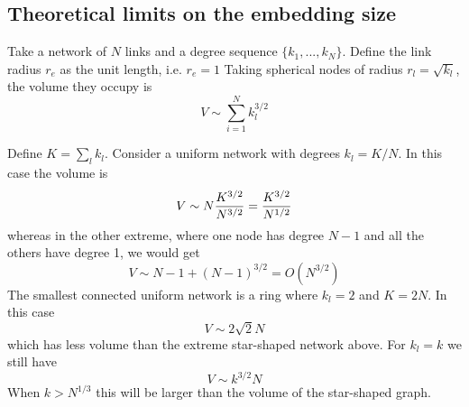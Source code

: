 \documentclass[nofootinbib,preprint,floatfix,titlepage,endfloats,superscriptaddress]{revtex4} %
\newcommand{\outNim}[1]{}
\begin{document}
\outNim{
Experimenting with the size of nodes revealed that instead of taking the area to be proportional to the degree, doing so with the node volume yields better results. This may be because of the following. 

Suppose we have $k$ links of cross-section $a_e$. 
Assume that they are uniformly spread at different solid angles around a center that is the center of the circular cap at one end of them. 
The question is: what is the minimum radius of sphere around the same center which would cross the links in such a way that the cross-section of one link on the sphere's surface would not intersect other links' cross-section. 
Take the circular cross-section of one link with the sphere. Connecting the center of the sphere to this circle yields a cone, whose volume is $h a_e /3$, with $h=\sqrt{r^2- r_e^2}$ being the height of the cone. If the number of links is large and we work with the smallest radius at which links don't intersect, the total volume of these cones will be close to the volume of the sphere, $4\pi r^3/3$. Solving for $r$ yields
\[ {k\pi\over 3} r_e^2 h \approx {k\pi\over 3} r_e^2 r =  {4\pi\over 3} r^3 \quad \Rightarrow \quad r = {\sqrt{k} \over 2} r_e  \]
When $k \gg 1$ The links may cover the surface of the sphere and so $k \pi r_e^2 \approx 4 \pi r^2$, which also yields $r = \sqrt{k}r_e /2$.  
However, when $k$ is small, the volume of the cones is much smaller than the volume of the sphere. In fact for $k=1,2$ the volume of the cones is zero and their cross-section with the sphere becomes one of the great circles of the sphere. This means that 
\[ \pi r_e^2 = \pi r^2  \quad \Rightarrow \quad  r = r_e.\]
} %

\subsection{Theoretical limits on the embedding size}
Take a network of $N$ links and a degree sequence $\{k_1,...,k_N\}$. Define the link radius $r_e$ as the unit length, i.e. $r_e = 1$ Taking spherical nodes of radius $r_l = \sqrt{k_l}$, the volume they occupy is 
\[V \sim \sum_{i=1}^N k_l^{3/2}\]


Define $K= \sum_l k_l$. 
Consider 
a uniform network with degrees $k_l = K/N$. In this case the volume is 
\begin{equation}
    V \sim N {K^{3/2}\over N^{3/2}} = {K^{3/2}\over N^{1/2}} \label{eq:uniform}
\end{equation}
whereas in the other extreme, where one node has degree $N-1$ and all the others have degree 1, we would get
\[V \sim N-1+ (N-1)^{3/2} = O( N^{3/2})\]
The smallest connected uniform network is a ring where $k_l=2$ and $K = 2N$. In this case
\[V\sim 2\sqrt{2} N \]
which has less volume than the extreme star-shaped network above. For $k_l = k $ we still have 
\[V \sim k^{3/2} N \]
When $k > N^{1/3}$ this will be larger than the volume of the star-shaped graph.
\end{document}
